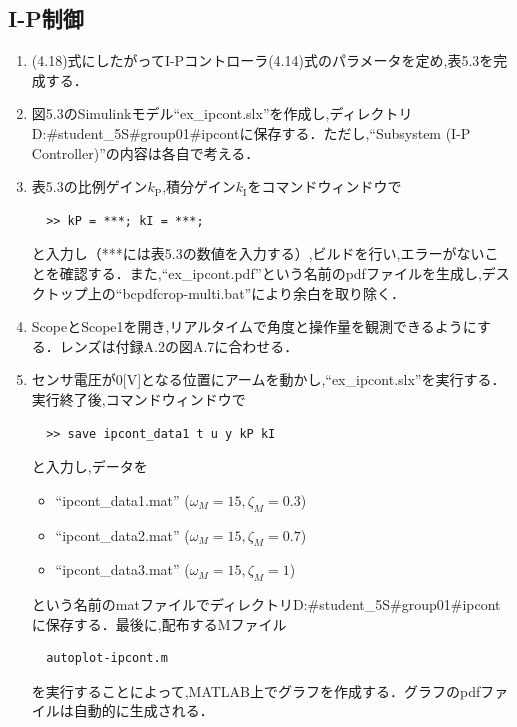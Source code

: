 \subsection{I-P制御}
\begin{enumerate}
  \item (4.18)式にしたがってI-Pコントローラ(4.14)式のパラメータを定め,表5.3を完成する．
  \item 図5.3のSimulinkモデル“ex\_ipcont.slx”を作成し,ディレクトリD:\#student\_5S\#group01\#ipcontに保存する．ただし,“Subsystem (I-P Controller)”の内容は各自で考える．
  \item 表5.3の比例ゲイン$k_{\mathrm{P}}$,積分ゲイン$k_{\mathrm{I}}$をコマンドウィンドウで
        \begin{verbatim}
  >> kP = ***; kI = ***;
  \end{verbatim}
        と入力し（***には表5.3の数値を入力する）,ビルドを行い,エラーがないことを確認する．また,“ex\_ipcont.pdf”という名前のpdfファイルを生成し,デスクトップ上の“bcpdfcrop-multi.bat”により余白を取り除く．
        
  \item ScopeとScope1を開き,リアルタイムで角度と操作量を観測できるようにする．レンズは付録A.2の図A.7に合わせる．
        
  \item センサ電圧が0[V]となる位置にアームを動かし,“ex\_ipcont.slx”を実行する．実行終了後,コマンドウィンドウで
        \begin{verbatim}
  >> save ipcont_data1 t u y kP kI
  \end{verbatim}
        と入力し,データを
        \begin{itemize}
          \item “ipcont\_data1.mat” ($\omega_M = 15, \zeta_M = 0.3$)
          \item “ipcont\_data2.mat” ($\omega_M = 15, \zeta_M = 0.7$)
          \item “ipcont\_data3.mat” ($\omega_M = 15, \zeta_M = 1$)
        \end{itemize}
        という名前のmatファイルでディレクトリD:\#student\_5S\#group01\#ipcontに保存する．最後に,配布するMファイル
        \begin{verbatim}
  autoplot-ipcont.m
  \end{verbatim}
        を実行することによって,MATLAB上でグラフを作成する．グラフのpdfファイルは自動的に生成される．
        
\end{enumerate}

